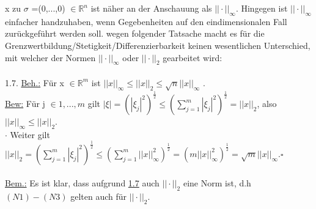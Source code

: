 \documentclass[11pt]{article}
\begin{document}
	x zu $\sigma$ =(0,...,0) $\in \mathbb{R}^n$ ist näher an der Anschauung als 
	$||\cdot||_\infty$. Hingegen ist $||\cdot||_\infty$ einfacher handzuhaben, 
	wenn Gegebenheiten auf den eindimensionalen Fall zurückgeführt werden soll.
	wegen folgender Tatsache macht es für die 
	Grenzwertbildung/Stetigkeit/Differenzierbarkeit keinen wesentlichen 
	Unterschied, mit welcher der Normen $||\cdot||_\infty$ oder $ ||\cdot||_2$ 
	gearbeitet wird:\\\\
	1.7. \underline{Beh.:} Für x $\in \mathbb{R}^m$ ist  
	\ul{$||x||_\infty \leq ||x||_2 \leq \sqrt{n} ||x||_\infty$} .\\
	\underline{Bew:} Für j $\in {1,...,m}$ gilt 
	$|\xi|=(|\xi_j|^2)^{\frac{1}{2}}\leq(\sum_{j=1}^{m}|\xi_j|^2)^{\frac{1}{2}}
	=||x||_2$, also $||x||_\infty \leq ||x||_2$.\\
	$\cdot$ Weiter gilt $||x||_2 = (\sum_{j=1}^{m}|\xi_j|^2)^{\frac{1}{2}}\leq 
	(\sum_{j=1}^{m}||x||_\infty^2)^{\frac{1}{2}}= 
	(m||x||_\infty^2)^{\frac{1}{2}}=\sqrt{m}||x||_\infty.\square$\\\\
	\underline{Bem.:} Es ist klar, dass aufgrund  \ul{1.7} 
	auch $||\cdot||_2$ eine Norm ist, d.h $(N1)-(N3)$ gelten auch für 
	$||\cdot||_2$.\\\\
	
\end{document}
